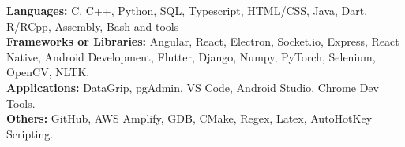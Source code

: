 \vspace{5pt}
{\bf Languages:} C, C++, Python, SQL, Typescript, HTML/CSS, Java, Dart, R/RCpp, Assembly, Bash and tools\\
{\bf Frameworks or Libraries:} Angular, React, Electron, Socket.io, Express,  React Native, Android Development, Flutter, Django, Numpy,  PyTorch, Selenium, OpenCV, NLTK.\\
{\bf Applications:} DataGrip, pgAdmin, VS Code, Android Studio, Chrome Dev Tools.\\
{\bf Others:} GitHub, AWS Amplify, GDB, CMake, Regex, Latex, AutoHotKey Scripting.\\
